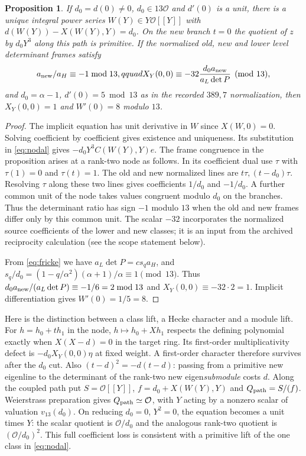 \documentclass[11pt]{article}
\newtheorem{proposition}{Proposition}
\newcommand{\OO}{\mathcal O}
\begin{document}
\begin{proposition}
If $d_0=d(0)\ne0$, $d_0\in13\OO$ and $d'(0)$ is a unit, there is
a unique integral power series $W(Y)\in Y\OO[[Y]]$ with
$d(W(Y))-X(W(Y),Y)=d_0$. On the new branch $t=0$ the quotient of
$z$ by $d_0Y^3$ along this path is primitive. If the normalized old,
new and lower level determinant frames satisfy
\[
 a_{\rm new}/a_H\equiv-1\bmod13,qquad
 X_Y(0,0)\equiv-32\frac{d_0 a_{\rm new}}{a_L\det P}\pmod{13},
\]
and $d_0=\alpha-1$, $d'(0)=5\bmod13$ as in the recorded $389,7$
normalization, then $X_Y(0,0)=1$ and $W'(0)=8$ modulo $13$.
\end{proposition}
\begin{proof}
The implicit equation has unit derivative in $W$ since $X(W,0)=0$.
Solving coefficient by coefficient gives existence and uniqueness.
Its substitution in \eqref{eq:nodal} gives $-d_0Y^3 C(W(Y),Y)e$.
The frame congruence in the proposition arises at a rank-two node as
follows. In its coefficient dual use $\tau$ with $\tau(1)=0$ and
$\tau(t)=1$. The old and new normalized lines are $t\tau,(t-d_0)\tau$.
Resolving $\tau$ along these two lines gives coefficients $1/d_0$
and $-1/d_0$. A further common unit of the node takes values congruent
modulo $d_0$ on the branches. Thus the determinant ratio has sign
$-1$ modulo $13$ when the old and new frames differ only by this common
unit. The scalar $-32$ incorporates the normalized source coefficients
of the lower and new classes; it is an input from the archived
reciprocity calculation (see the scope statement below).

From \eqref{eq:fricke} we have $a_L\det P=c s_q a_H$, and
$s_q/d_0=(1-q/\alpha^2)(\alpha+1)/\alpha\equiv1\pmod{13}$.
Thus $d_0a_{\rm new}/(a_L\det P)\equiv-1/6=2\bmod13$ and
$X_Y(0,0)\equiv-32\cdot2=1$. Implicit differentiation gives $W'(0)=1/5=8$.
\end{proof}

Here is the distinction between a class lift, a Hecke character and
a module lift. For $h=h_0+t h_1$ in the node,
$h\mapsto h_0+X h_1$ respects the defining polynomial exactly when
$X(X-d)=0$ in the target ring. Its first-order multiplicativity
defect is $-d_0 X_Y(0,0)\eta$ at fixed weight. A first-order
character therefore survives after the $d_0$ cut. Also
$(t-d)^2=-d(t-d)$: passing from a primitive new eigenline to the
determinant of the rank-two new eigen\emph{submodule} costs $d$.
Along the coupled path put $S=\OO[[Y]]$, $f=d_0+X(W(Y),Y)$ and
$Q_{\rm path}=S/(f)$. Weierstrass preparation gives $Q_{\rm path}\simeq\OO$,
with $Y$ acting by a nonzero scalar of valuation $v_{13}(d_0)$.
On reducing $d_0=0$, $Y^2=0$, the equation becomes a unit times $Y$:
the scalar quotient is $\OO/d_0$ and the analogous rank-two quotient
is $(\OO/d_0)^2$. This full coefficient loss is consistent with a
primitive lift of the one class in \eqref{eq:nodal}.
\end{document}
